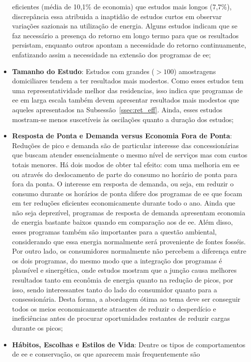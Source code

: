 \begin{itemize}
eficientes (média de 10,1\% de economia) que estudos mais longos (7,7\%),
discrepância essa atribuida a inaptidão de estudos curtos em observar variações
sazionais na utilização de energia. Alguns estudos indicam que se faz necessário 
a presença do retorno em longo termo para que os resultados persistam, 
enquanto outros apontam a necessidade do retorno continuamente, enfatizando
assim a necessidade na extensão dos programas de \gls{ee};
\item \textbf{Tamanho do Estudo}: Estudos com grandes ($> 100$) amostragens
domiciliares tendem a ter resultados mais modestos. Como esses estudos tem uma
representatividade melhor das residencias, isso indica que programas de
\gls{ee} em larga escala também devem apresentar resultados mais modestos que
aqueles apresentados na Subsessão~\ref{ssec:ret_eff}.
Ainda, esses estudos mostram-se menos suscetíveis às oscilações 
quanto a duração dos estudos;
\item \textbf{Resposta de Ponta e Demanda versus Economia Fora de
Ponta}: Reduções de pico e demanda são de particular interesse das
concessionárias que buscam atender essencialmente o mesmo nível de
serviços mas com custos totais menores. Há dois modos de obter tal
efeito: com uma melhoria em \gls{ee} ou através do deslocamento de
parte do consumo no horário de ponta para fora da ponta. O interesse
em resposta de demanda, ou seja, em reduzir o consumo durante os
horários de ponta difere dos programas de \gls{ee} que focam em ter
reduções eficientes economicamente durante todo o ano. Ainda que não
seja deprezível, programas de resposta de demanda apresentam economia
de energia bastante baixos quando em comparação aos de \gls{ee}. Além
disso, esses programas também são importantes para a questão
ambiental, considerando que essa energia normalmente será proveniente
de fontes fosséis. Por outro lado, os consumidores normalmente não
percebem a diferença entre os dois programas, do mesmo modo que a
integração dos programas é plausível e sinergética, onde estudos
mostram que a junção causa melhores resultados tanto em econômia de
energia quanto na redução de picos, por isso, sendo interessantes
tanto do lado do consumidor quanto para a consessionária. Desta forma,
a abordagem ótima ao tema deve ser conseguir todos os meios
economicamente atraentes de reduzir o desperdício e ineficiências
antes de procurar oportunidades restantes de reduzir cargas durante os
picos;
\item \textbf{Hábitos, Escolhas e Estilos de Vida}: Dentre os tipos de
comportamentos de \gls{ee} e conservação, os que aparecem mais frequentemente são 

\end{itemize}
